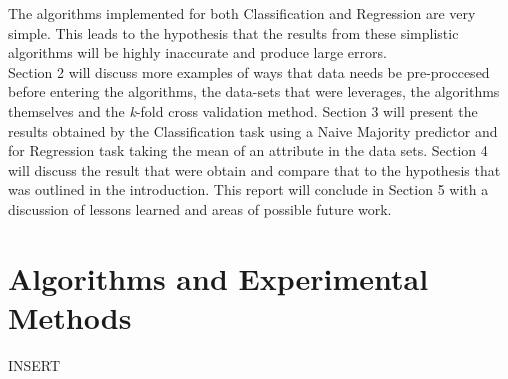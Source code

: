 \documentclass[twoside,11pt]{article}
\begin{document}
\hspace*{10mm} The algorithms implemented for both Classification and Regression are very simple. This leads to the hypothesis that the results from these simplistic algorithms will be highly inaccurate and produce large errors.\\
\hspace*{10mm} Section 2 will discuss more examples of ways that data needs be pre-proccesed before entering the algorithms, the data-sets that were leverages, the algorithms themselves and the \textit{k}-fold cross validation method. Section 3 will present the results obtained by the Classification task using a Naive Majority predictor and for Regression task taking the mean of an attribute in the data sets. Section 4 will discuss the result that were obtain and compare that to the hypothesis that was outlined in the introduction. This report will conclude in Section 5 with a discussion of lessons learned and areas of possible future work.\\

\newpage


\section{Algorithms and Experimental Methods}
INSERT\\
\end{document}

